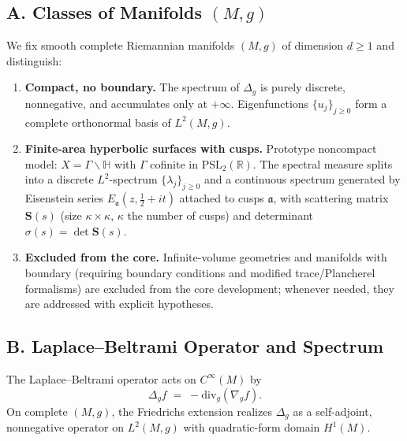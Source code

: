 \subsection*{A. Classes of Manifolds $(M,g)$}
\label{subsec:classes}

We fix smooth complete Riemannian manifolds $(M,g)$ of dimension $d\ge1$ and distinguish:
\begin{enumerate}[label=(\roman*)]

  \item \textbf{Compact, no boundary.}
        The spectrum of $\Delta_g$ is purely discrete, nonnegative, and accumulates only at $+\infty$.
        Eigenfunctions $\{u_j\}_{j\ge0}$ form a complete orthonormal basis of $L^2(M,g)$.

  \item \textbf{Finite-area hyperbolic surfaces with cusps.}
        Prototype noncompact model: $X=\Gamma\backslash\mathbb{H}$ with $\Gamma$ cofinite in $\mathrm{PSL}_2(\mathbb{R})$.
        The spectral measure splits into a discrete $L^2$-spectrum $\{\lambda_j\}_{j\ge0}$ and a continuous spectrum generated by Eisenstein series
        $E_{\mathfrak a}(z,\tfrac12+it)$ attached to cusps $\mathfrak a$, with scattering matrix $\mathbf{S}(s)$ (size $\kappa\times \kappa$, $\kappa$ the number of cusps) and determinant $\sigma(s)=\det \mathbf{S}(s)$.

  \item \textbf{Excluded from the core.}
        Infinite-volume geometries and manifolds with boundary (requiring boundary conditions and modified trace/Plancherel formalisms) are excluded from the core development; whenever needed, they are addressed with explicit hypotheses.

\end{enumerate}

\subsection*{B. Laplace--Beltrami Operator and Spectrum}
\label{subsec:laplacian}

The Laplace--Beltrami operator acts on $C^\infty(M)$ by
\[
   \Delta_g f \;=\; -\mathrm{div}_g(\nabla_g f).
\]
On complete $(M,g)$, the Friedrichs extension realizes $\Delta_g$ as a self-adjoint,
nonnegative operator on $L^2(M,g)$ with quadratic-form domain $H^1(M)$.


